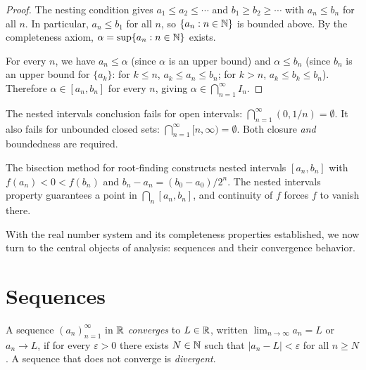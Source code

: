 \documentclass[11pt,a4paper]{article}
\begin{document}
\begin{proof}
The nesting condition gives $a_1 \le a_2 \le \cdots$ and
$b_1 \ge b_2 \ge \cdots$ with $a_n \le b_n$ for all $n$. In particular,
$a_n \le b_1$ for all $n$, so $\{a_n : n \in \mathbb{N}\}$ is bounded above.
By the completeness axiom, $\alpha = \sup\{a_n : n \in \mathbb{N}\}$ exists.

For every $n$, we have $a_n \le \alpha$ (since $\alpha$ is an upper
bound) and $\alpha \le b_n$ (since $b_n$ is an upper bound for
$\{a_k\}$: for $k \le n$, $a_k \le a_n \le b_n$; for $k > n$,
$a_k \le b_k \le b_n$). Therefore $\alpha \in [a_n, b_n]$ for every
$n$, giving $\alpha \in \bigcap_{n=1}^\infty I_n$.
\end{proof}

\begin{warning}[title={Closure and boundedness are both essential}]
The nested intervals conclusion fails for open intervals:
$\bigcap_{n=1}^\infty (0, 1/n) = \emptyset$.
It also fails for unbounded closed sets:
$\bigcap_{n=1}^\infty [n, \infty) = \emptyset$.
Both closure \emph{and} boundedness are required.
\end{warning}

\begin{example}
\label{ex:bisection}
The bisection method for root-finding constructs nested intervals
$[a_n, b_n]$ with $f(a_n) < 0 < f(b_n)$ and $b_n - a_n = (b_0 - a_0)/2^n$.
The nested intervals property guarantees a point in $\bigcap_n [a_n, b_n]$,
and continuity of $f$ forces $f$ to vanish there.
\end{example}

With the real number system and its completeness properties established,
we now turn to the central objects of analysis: sequences and their
convergence behavior.

\section{Sequences}
\label{sec:sequences}

\begin{definition}[Convergence]
\label{def:convergence}
A sequence $(a_n)_{n=1}^\infty$ in $\mathbb{R}$ \emph{converges} to $L \in \mathbb{R}$,
written $\lim_{n \to \infty} a_n = L$ or $a_n \to L$, if for every
$\varepsilon > 0$ there exists $N \in \mathbb{N}$ such that $|a_n - L| <
\varepsilon$ for all $n \ge N$. A sequence that does not converge is
\emph{divergent}.
\end{definition}
\end{document}
